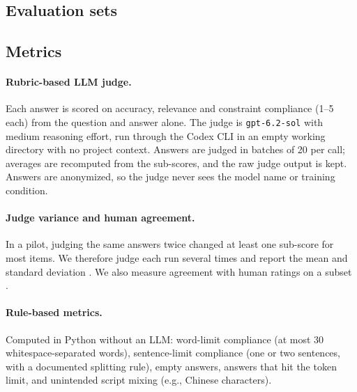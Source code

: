 \subsection{Evaluation sets}
\label{sec:setup-data}


\subsection{Metrics}
\label{sec:setup-metrics}

\paragraph{Rubric-based LLM judge.}
Each answer is scored on accuracy, relevance and constraint compliance (1--5 each) from the question and answer alone.
The judge is \texttt{gpt-6.2-sol} with medium reasoning effort, run through the Codex CLI in an empty working directory with no project context.
Answers are judged in batches of 20 per call; averages are recomputed from the sub-scores, and the raw judge output is kept.
Answers are anonymized, so the judge never sees the model name or training condition.

\paragraph{Judge variance and human agreement.}
In a pilot, judging the same answers twice changed at least one sub-score for most items.
We therefore judge each run several times and report the mean and standard deviation .
We also measure agreement with human ratings on a subset .

\paragraph{Rule-based metrics.}
Computed in Python without an LLM:
word-limit compliance (at most 30 whitespace-separated words),
sentence-limit compliance (one or two sentences, with a documented splitting rule),
empty answers, answers that hit the token limit,
and unintended script mixing (e.g., Chinese characters).

